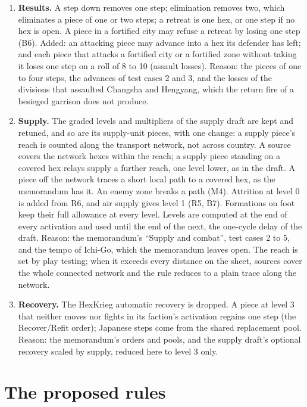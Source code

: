 \documentclass[11pt]{article}
\begin{document}
\begin{enumerate}[label=M\arabic*.,leftmargin=*,itemsep=3pt]
\item \textbf{Results.} A step down removes one step; elimination removes two, which eliminates a piece of one or two steps; a retreat is one hex, or one step if no hex is open. A piece in a fortified city may refuse a retreat by losing one step (B6). Added: an attacking piece may advance into a hex its defender has left; and each piece that attacks a fortified city or a fortified zone without taking it loses one step on a roll of 8 to 10 (assault losses). Reason: the pieces of one to four steps, the advances of test cases 2 and 3, and the losses of the divisions that assaulted Changsha and Hengyang, which the return fire of a besieged garrison does not produce.
\item \textbf{Supply.} The graded levels and multipliers of the supply draft are kept and retuned, and so are its supply-unit pieces, with one change: a supply piece's reach is counted along the transport network, not across country. A source covers the network hexes within the reach; a supply piece standing on a covered hex relays supply a further reach, one level lower, as in the draft. A piece off the network traces a short local path to a covered hex, as the memorandum has it. An enemy zone breaks a path (M4). Attrition at level 0 is added from R6, and air supply gives level 1 (R5, B7). Formations on foot keep their full allowance at every level. Levels are computed at the end of every activation and used until the end of the next, the one-cycle delay of the draft. Reason: the memorandum's ``Supply and combat'', test cases 2 to 5, and the tempo of Ichi-Go, which the memorandum leaves open. The reach is set by play testing; when it exceeds every distance on the sheet, sources cover the whole connected network and the rule reduces to a plain trace along the network.
\item \textbf{Recovery.} The HexKrieg automatic recovery is dropped. A piece at level 3 that neither moves nor fights in its faction's activation regains one step (the Recover/Refit order); Japanese steps come from the shared replacement pool. Reason: the memorandum's orders and pools, and the supply draft's optional recovery scaled by supply, reduced here to level 3 only.
\end{enumerate}

\section{The proposed rules}\label{sec:rules}
\end{document}
